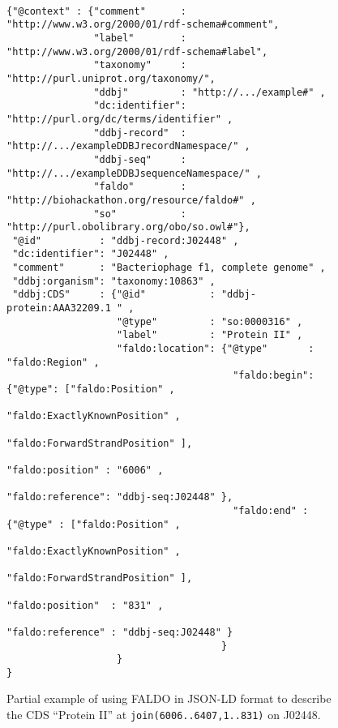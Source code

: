 \begin{figure}
\begin{shaded}
\small
\begin{verbatim}

{"@context" : {"comment"      : "http://www.w3.org/2000/01/rdf-schema#comment",
               "label"        : "http://www.w3.org/2000/01/rdf-schema#label",
               "taxonomy"     : "http://purl.uniprot.org/taxonomy/",
               "ddbj"         : "http://.../example#" ,
               "dc:identifier": "http://purl.org/dc/terms/identifier" ,
               "ddbj-record"  :  "http://.../exampleDDBJrecordNamespace/" ,
               "ddbj-seq"     :  "http://.../exampleDDBJsequenceNamespace/" ,
               "faldo"        : "http://biohackathon.org/resource/faldo#" ,
               "so"           : "http://purl.obolibrary.org/obo/so.owl#"},
 "@id"          : "ddbj-record:J02448" ,
 "dc:identifier": "J02448" ,
 "comment"      : "Bacteriophage f1, complete genome" ,
 "ddbj:organism": "taxonomy:10863" ,
 "ddbj:CDS"     : {"@id"           : "ddbj-protein:AAA32209.1 " ,
                   "@type"         : "so:0000316" ,
                   "label"         : "Protein II" ,
                   "faldo:location": {"@type"       : "faldo:Region" ,
                                       "faldo:begin": {"@type": ["faldo:Position" , 
                                                                 "faldo:ExactlyKnownPosition" ,
                                                                 "faldo:ForwardStrandPosition" ],
                                                       "faldo:position" : "6006" ,
                                                       "faldo:reference": "ddbj-seq:J02448" },
                                       "faldo:end" : {"@type" : ["faldo:Position" , 
                                                                 "faldo:ExactlyKnownPosition" ,
                                                                 "faldo:ForwardStrandPosition" ],
                                                      "faldo:position"  : "831" ,
                                                      "faldo:reference" : "ddbj-seq:J02448" }
                                     }
                   }
}
\end{verbatim}
\end{shaded}
\caption{Partial example of using FALDO in JSON-LD format to describe
the CDS ``Protein II'' at \texttt{join(6006..6407,1..831)} on J02448.}
\label{fig:insdcReverseOverOrigin}
\end{figure}


